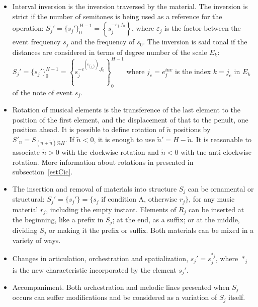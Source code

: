 \documentclass[
 aip,
 jmp,
 amsmath,amssymb,
 reprint,
]{revtex4-1}
\begin{document}
\begin{itemize}
        \item Interval inversion is the inversion traversed by
        the material. The inversion is strict if the number of semitones is
        being used as a reference for the operation:
        $S_j'=\{s_j'\}_0^{H-1}=\left\{s_j^{-\varepsilon_j . f_0}\right\}$, where
        $\varepsilon_j$ is the factor between the event frequency $s_j$ and the
        frequency of $s_0$. The inversion is said tonal if the distances are
        considered in terms of degree number of the scale $E_k$:
        $S_j'=\{s_j'\}_0^{H-1}=\left\{s_j^{-\varepsilon^{\left(e_{\left(j_e\right)}\right)}
        . f_0}\right\}_0^{H-1}$ where $j_e=e_{j}^{inv}$ is the index $k=j_e$ in
        $E_k$ of the note of event $s_j$.

        \item Rotation of musical elements is the transference of the last
        element to the position of the first element, and the displacement of
        that to the penult, one position ahead. It is possible to define
        rotation of $\tilde{n}$ positions by $S'_n=S_{(n+\tilde{n})\%H}$. If
        $\tilde{n}<0$, it is enough to use $\tilde{n}'=H-\tilde{n}$. It is
        reasonable to associate $\tilde{n}>0$ with the clockwise rotation and
        $\tilde{n}<0$ with tne anti clockwise rotation. More information about rotations in presented in subsection~\ref{estCic}.

        \item The insertion and removal of materials into structure $S_j$ can be
    ornamental or structural: $S_j'=\{s_j'\}=\{s_j \text{ if condition A,
    otherwise } r_j\}$, for any music material $r_j$, including the empty
    instant. Elements of $R_j$ can be inserted at the beginning, like a prefix
    in $S_j$; at the end, as a suffix; or at the middle, dividing $S_j$ or making
    it the prefix or suffix. Both materials can be mixed in a variety of ways.

    \item Changes in articulation, orchestration and spatialization, 
    $s_j'=s_j^{*_j}$, where $*_j$ is the new characteristic incorporated by the
    element $s_j'$.
    
    \item Accompaniment. Both orchestration and melodic lines presented when
    $S_j$ occurs can suffer modifications and be considered as a variation of $S_j$ itself.
\end{itemize}
\end{document}
